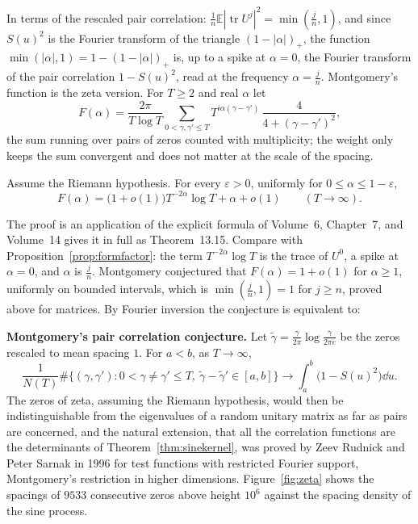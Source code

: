 In terms of the rescaled pair correlation: $\frac1n\mathbb E|\operatorname{tr}U^j|^2=\min(\frac jn,1)$, and since $S(u)^2$ is the Fourier transform of the triangle $(1-|\alpha|)_+$, the function $\min(|\alpha|,1)=1-(1-|\alpha|)_+$ is, up to a spike at $\alpha=0$, the Fourier transform of the pair correlation $1-S(u)^2$, read at the frequency $\alpha=\frac jn$. Montgomery's
function is the zeta version. For $T\ge2$ and real $\alpha$ let
\[
F(\alpha)=\frac{2\pi}{T\log T}\sum_{0<\gamma,\gamma'\le T}T^{i\alpha(\gamma-\gamma')}\,\frac4{4+(\gamma-\gamma')^2},
\]
the sum running over pairs of zeros counted with multiplicity; the weight only keeps the sum convergent and does not matter at the scale of the spacing.

\begin{theorem}\label{thm:montgomery}
Assume the Riemann hypothesis. For every $\varepsilon>0$, uniformly for $0\le\alpha\le1-\varepsilon$,
\[
F(\alpha)=\bigl(1+o(1)\bigr)T^{-2\alpha}\log T+\alpha+o(1)\qquad(T\to\infty).
\]
\end{theorem}

The proof is an application of the explicit formula of Volume~6, Chapter~7, and Volume~14 gives it in full as Theorem~13.15. Compare with Proposition~\ref{prop:formfactor}: the term $T^{-2\alpha}\log T$ is the trace of $U^0$, a spike at $\alpha=0$, and $\alpha$ is
$\frac jn$. Montgomery conjectured that $F(\alpha)=1+o(1)$ for $\alpha\ge1$, uniformly on bounded intervals, which is $\min(\frac jn,1)=1$ for $j\ge n$, proved above for matrices. By Fourier inversion the conjecture is equivalent to:

\begin{beauty}
\textbf{Montgomery's pair correlation conjecture.} Let $\tilde\gamma=\frac\gamma{2\pi}\log\frac\gamma{2\pi e}$ be the zeros rescaled to mean spacing $1$. For $a<b$, as $T\to\infty$,
\[
\frac1{N(T)}\#\bigl\{(\gamma,\gamma'):0<\gamma\ne\gamma'\le T,\ \tilde\gamma-\tilde\gamma'\in[a,b]\bigr\}\longrightarrow\int_a^b\bigl(1-S(u)^2\bigr)\dd u.
\]
The zeros of zeta, assuming the Riemann hypothesis, would then be indistinguishable from the eigenvalues of a random unitary matrix as far as pairs are concerned, and the natural extension, that all the correlation functions
are the determinants of Theorem~\ref{thm:sinekernel}, was proved by Zeev Rudnick and Peter Sarnak in 1996 for test functions with restricted Fourier support, Montgomery's restriction in higher dimensions. Figure~\ref{fig:zeta}
shows the spacings of $9533$ consecutive zeros above height $10^6$ against the spacing density of the sine process.
\end{beauty}

